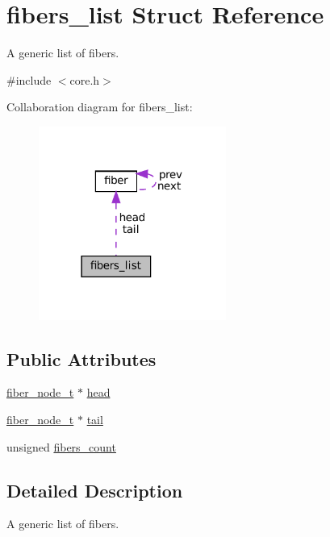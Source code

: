 \hypertarget{structfibers__list}{}\section{fibers\+\_\+list Struct Reference}
\label{structfibers__list}


A generic list of fibers.  




{\ttfamily \#include $<$core.\+h$>$}



Collaboration diagram for fibers\+\_\+list\+:
\nopagebreak
\begin{figure}[H]
\begin{center}
\leavevmode
\includegraphics[width=174pt]{structfibers__list__coll__graph}
\end{center}
\end{figure}
\subsection*{Public Attributes}
\begin{DoxyCompactItemize}
\item 
\mbox{\hyperlink{core_8h_adb14c8b48a1d56cf9c6632295ab90048}{fiber\+\_\+node\+\_\+t}} $\ast$ \mbox{\hyperlink{structfibers__list_aa1dd39c8c192607d164f204821d5b3ed}{head}}
\item 
\mbox{\hyperlink{core_8h_adb14c8b48a1d56cf9c6632295ab90048}{fiber\+\_\+node\+\_\+t}} $\ast$ \mbox{\hyperlink{structfibers__list_af94c6bcedeb27c078ea1fa4869c53673}{tail}}
\item 
unsigned \mbox{\hyperlink{structfibers__list_a54a8a9f5a97c783b1461257d6e07aa1a}{fibers\+\_\+count}}
\end{DoxyCompactItemize}


\subsection{Detailed Description}
A generic list of fibers. 

